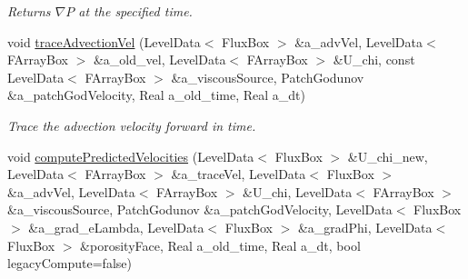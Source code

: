 \begin{DoxyCompactItemize}
\begin{DoxyCompactList}\small\item\em Returns $ \nabla P $ at the specified time. \end{DoxyCompactList}\item 
\hypertarget{class_a_m_r_level_mushy_layer_a1da14630642f32edf8ab0c3d27ecf60e}{void \hyperlink{class_a_m_r_level_mushy_layer_a1da14630642f32edf8ab0c3d27ecf60e}{trace\-Advection\-Vel} (Level\-Data$<$ Flux\-Box $>$ \&a\-\_\-adv\-Vel, Level\-Data$<$ F\-Array\-Box $>$ \&a\-\_\-old\-\_\-vel, Level\-Data$<$ F\-Array\-Box $>$ \&U\-\_\-chi, const Level\-Data$<$ F\-Array\-Box $>$ \&a\-\_\-viscous\-Source, Patch\-Godunov \&a\-\_\-patch\-God\-Velocity, Real a\-\_\-old\-\_\-time, Real a\-\_\-dt)}\label{class_a_m_r_level_mushy_layer_a1da14630642f32edf8ab0c3d27ecf60e}

\begin{DoxyCompactList}\small\item\em Trace the advection velocity forward in time. \end{DoxyCompactList}\item 
\hypertarget{class_a_m_r_level_mushy_layer_a93fde307e987b4d1e5dbdb06b29d23d0}{void \hyperlink{class_a_m_r_level_mushy_layer_a93fde307e987b4d1e5dbdb06b29d23d0}{compute\-Predicted\-Velocities} (Level\-Data$<$ Flux\-Box $>$ \&U\-\_\-chi\-\_\-new, Level\-Data$<$ F\-Array\-Box $>$ \&a\-\_\-trace\-Vel, Level\-Data$<$ Flux\-Box $>$ \&a\-\_\-adv\-Vel, Level\-Data$<$ F\-Array\-Box $>$ \&U\-\_\-chi, Level\-Data$<$ F\-Array\-Box $>$ \&a\-\_\-viscous\-Source, Patch\-Godunov \&a\-\_\-patch\-God\-Velocity, Level\-Data$<$ Flux\-Box $>$ \&a\-\_\-grad\-\_\-e\-Lambda, Level\-Data$<$ Flux\-Box $>$ \&a\-\_\-grad\-Phi, Level\-Data$<$ Flux\-Box $>$ \&porosity\-Face, Real a\-\_\-old\-\_\-time, Real a\-\_\-dt, bool legacy\-Compute=false)}\label{class_a_m_r_level_mushy_layer_a93fde307e987b4d1e5dbdb06b29d23d0}


\end{DoxyCompactItemize}
